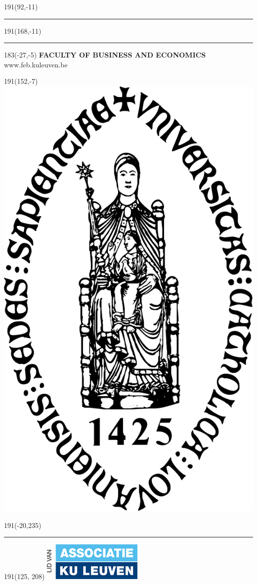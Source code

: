 \documentclass[12pt,a4paper,oneside]{report}
\begin{document}
\newpage
\thispagestyle{empty}
\sffamily
%
\begin{textblock}{191}(92,-11)
{\color{blueline}\rule{217pt}{5.5pt}}
\end{textblock}
%
\begin{textblock}{191}(168,-11)
{\color{blueline}\rule{5.5pt}{80pt}}
\end{textblock}
%
\begin{textblock}{183}(-27,-5)
\textblockcolour{}
\flushright
\fontsize{8}{10}\selectfont
\textbf{FACULTY OF BUSINESS AND ECONOMICS}\\
www.feb.kuleuven.be\\
\end{textblock}
%
\begin{textblock}{191}(152,-7)
\textblockcolour{}
\includegraphics*[height=24truemm]{9 MainFormat/sedes}
\end{textblock}
%
\begin{textblock}{191}(-20,235)
{\color{bluetitle}\rule{544pt}{55pt}}
\end{textblock}
%
\begin{textblock}{191}(125, 208)
\textblockcolour{}
\includegraphics*[height=15truemm]{9 MainFormat/LogoKULASSOC}
\end{textblock}
\end{document}
